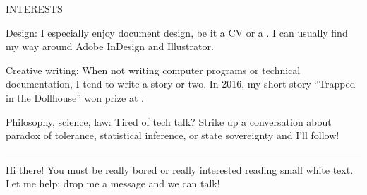 \begin{minipage}[t]{\linewidth}\vspace{\sectionTopmargin}
{\alignRight\titleFont\light INTERESTS}\linebreak\newline

\vspace{\contentTopMargin}
{\contentFont\bold Design: \medium I especially enjoy document design, be it a CV or a . I can usually find my way around Adobe InDesign and Illustrator.} %

\vspace{2mm}
{\contentFont\bold Creative writing: \medium When not writing computer programs or technical documentation, I tend to write a story or two. In 2016, my short story ``Trapped in the Dollhouse'' won  prize at .}

\vspace{2mm}
{\contentFont\bold Philosophy, science, law: \medium Tired of tech talk? Strike up a conversation about paradox of tolerance, statistical inference, or state sovereignty and I'll follow!}

\vspace{-2mm}
\rule{\linewidth}{0.1mm}
{\parbox{\linewidth}{\color{white}\fontsize{6.5}{8}\selectfont Hi there! You must be really bored or really interested reading small white text. Let me help: drop me a message and we can talk!}}
\end{minipage}